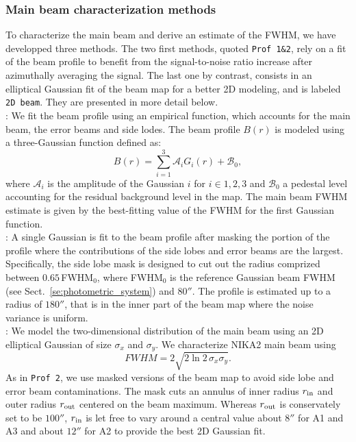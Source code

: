 \subsubsection{Main beam characterization methods}
\label{se:mainbeam_methods}
To characterize the main beam and derive an estimate of the FWHM, we
have developped three methods. The two first methods, quoted
{\tt Prof 1\&2}, rely on a fit of the beam profile to benefit from the
signal-to-noise ratio increase after azimuthally averaging the
signal. The last one by contrast,
consists in an elliptical Gaussian fit of the beam map for a better
2D modeling, and is labeled {\tt 2D beam}. They are presented in more
detail below. \\

: We fit the beam profile using an empirical function,
which accounts for the main beam, the error beams and side
lodes.%
The beam profile $B(r)$ is modeled using a three-Gaussian function defined as:
\begin{equation}
  B(r) = \sum_{i=1}^{3} \mathcal{A}_i G_i(r) + \mathcal{B}_0,
  \label{eq:3gauss}
\end{equation}
where $\mathcal{A}_i$ is the amplitude of the Gaussian $i$ for $i \in {1, 2, 3}$ and
$\mathcal{B}_0$ a pedestal level accounting for the residual background
level in the map. The main beam FWHM estimate is given by the best-fitting value
of the FWHM for the first Gaussian function.\\

: A single Gaussian is fit to the beam profile after
masking the portion of the profile where the contributions of the side
lobes and error beams are the largest. Specifically, the side lobe mask
is designed to cut out the radius comprized between $0.65\, $FWHM$_0$,
where FWHM$_0$ is the reference Gaussian beam FWHM (see
Sect.~\ref{se:photometric_system}) and $80''$. %
The profile is estimated up to a radius of
$180''$, that is in the inner part of the beam map where the noise
variance is uniform.\\

: We model the two-dimensional distribution of the main
beam using an 2D elliptical Gaussian of size $\sigma_x$ and
$\sigma_y$. We characterize NIKA2 main beam using
\begin{equation}
  FWHM = 2 \sqrt{2\ln {2}\, \sigma_x\sigma_y}.
\end{equation}
As in {\tt Prof 2}, we use masked versions of the
beam map to avoid side lobe and error beam contaminations.
The mask cuts an annulus of inner radius
$r_{\rm{in}}$ and outer radius $r_{\rm{out}}$ centered on the beam
maximum. Whereas $r_{\rm{out}}$ is conservately set to be $100''$,
$r_{\rm{in}}$ is let free to vary around a central value about $8''$
for A1 and A3 and about $12''$ for A2 to provide the best 2D Gaussian
fit.

